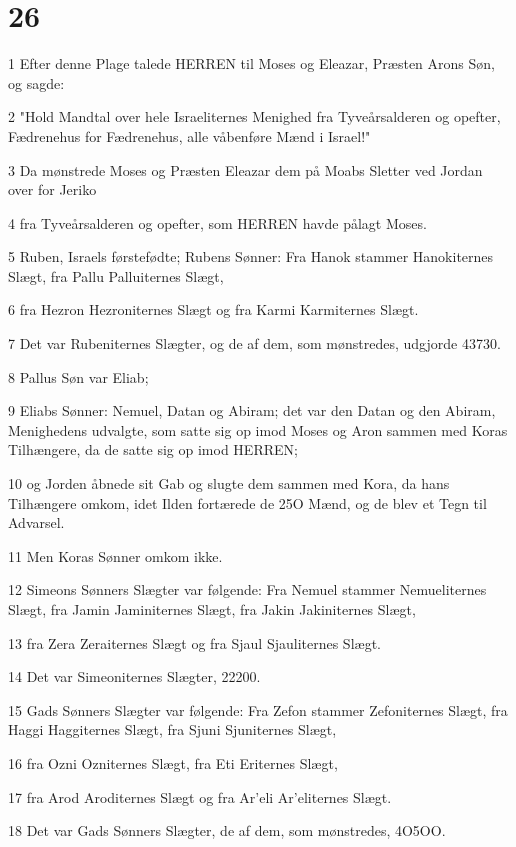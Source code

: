 \chapter{26}

\par 1 Efter denne Plage talede HERREN til Moses og Eleazar, Præsten Arons Søn, og sagde:
\par 2 "Hold Mandtal over hele Israeliternes Menighed fra Tyveårsalderen og opefter, Fædrenehus for Fædrenehus, alle våbenføre Mænd i Israel!"
\par 3 Da mønstrede Moses og Præsten Eleazar dem på Moabs Sletter ved Jordan over for Jeriko
\par 4 fra Tyveårsalderen og opefter, som HERREN havde pålagt Moses.
\par 5 Ruben, Israels førstefødte; Rubens Sønner: Fra Hanok stammer Hanokiternes Slægt, fra Pallu Palluiternes Slægt,
\par 6 fra Hezron Hezroniternes Slægt og fra Karmi Karmiternes Slægt.
\par 7 Det var Rubeniternes Slægter, og de af dem, som mønstredes, udgjorde 43730.
\par 8 Pallus Søn var Eliab;
\par 9 Eliabs Sønner: Nemuel, Datan og Abiram; det var den Datan og den Abiram, Menighedens udvalgte, som satte sig op imod Moses og Aron sammen med Koras Tilhængere, da de satte sig op imod HERREN;
\par 10 og Jorden åbnede sit Gab og slugte dem sammen med Kora, da hans Tilhængere omkom, idet Ilden fortærede de 25O Mænd, og de blev et Tegn til Advarsel.
\par 11 Men Koras Sønner omkom ikke.
\par 12 Simeons Sønners Slægter var følgende: Fra Nemuel stammer Nemueliternes Slægt, fra Jamin Jaminiternes Slægt, fra Jakin Jakiniternes Slægt,
\par 13 fra Zera Zeraiternes Slægt og fra Sjaul Sjauliternes Slægt.
\par 14 Det var Simeoniternes Slægter, 22200.
\par 15 Gads Sønners Slægter var følgende: Fra Zefon stammer Zefoniternes Slægt, fra Haggi Haggiternes Slægt, fra Sjuni Sjuniternes Slægt,
\par 16 fra Ozni Ozniternes Slægt, fra Eti Eriternes Slægt,
\par 17 fra Arod Aroditernes Slægt og fra Ar'eli Ar'eliternes Slægt.
\par 18 Det var Gads Sønners Slægter, de af dem, som mønstredes, 4O5OO.
